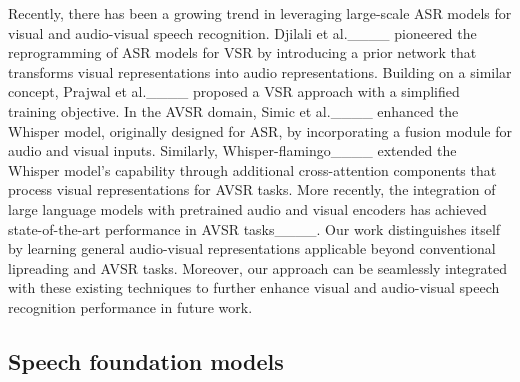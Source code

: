 


Recently, there has been a growing trend in leveraging large-scale ASR models for visual and audio-visual speech recognition. 
Djilali et al.____ pioneered the reprogramming of ASR models for VSR by introducing a prior network that transforms visual representations into audio representations. 
Building on a similar concept, Prajwal et al.____ proposed a VSR approach with a simplified training objective. 
In the AVSR domain, Simic et al.____ enhanced the Whisper model, originally designed for ASR, by incorporating a fusion module for audio and visual inputs. 
Similarly, Whisper-flamingo____ extended the Whisper model's capability through additional cross-attention components that process visual representations for AVSR tasks. 
More recently, the integration of large language models with pretrained audio and visual encoders has achieved state-of-the-art performance in AVSR tasks____. 
Our work distinguishes itself by learning general audio-visual representations applicable beyond conventional lipreading and AVSR tasks. 
Moreover, our approach can be seamlessly integrated with these existing techniques to further enhance 
visual and audio-visual speech recognition performance in future work.


 
\subsection{Speech foundation models}


